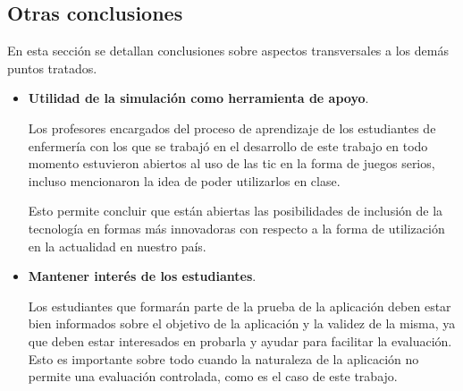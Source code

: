 \subsection{Otras conclusiones}

En esta sección se detallan conclusiones sobre aspectos transversales 
a los demás puntos tratados.

\begin{itemize}
\item \textbf{Utilidad de la simulación como herramienta de apoyo}.

Los profesores encargados del proceso de aprendizaje de los estudiantes de
enfermería con los que se trabajó en el desarrollo de este trabajo en todo
momento estuvieron abiertos al uso de las \Gls{tic} en la forma de juegos
serios, incluso mencionaron la idea de poder utilizarlos en clase. 

Esto permite concluir que están abiertas las posibilidades de inclusión de la
tecnología en formas más innovadoras con respecto a la forma de utilización en
la actualidad en nuestro país.

\item \textbf{Mantener interés de los estudiantes}.

Los estudiantes que formarán parte de la prueba de la aplicación deben estar
bien informados sobre el objetivo de la aplicación y la validez de la misma, 
ya que deben estar interesados en probarla y ayudar para facilitar la 
evaluación. Esto es importante sobre todo cuando la naturaleza de la 
aplicación no permite una evaluación controlada, como es el caso de este 
trabajo.

\end{itemize}


